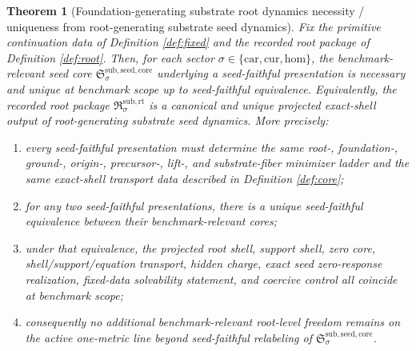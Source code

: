 \documentclass[11pt]{article}
\newcommand{\Car}{\mathrm{car}}
\newcommand{\Cur}{\mathrm{cur}}
\newcommand{\Hom}{\mathrm{hom}}
\newcommand{\RootPackage}{\mathfrak R^{\mathrm{sub,rt}}}
\newcommand{\SeedCore}{\mathfrak S^{\mathrm{sub,seed,core}}}
\newtheorem{theorem}{Theorem}
\begin{document}
\begin{theorem}[Foundation-generating substrate root dynamics necessity / uniqueness from root-generating substrate seed dynamics]
\label{thm:main}
Fix the primitive continuation data of Definition \ref{def:fixed} and the recorded root package of Definition \ref{def:root}. Then, for each sector \(\sigma\in\{\Car,\Cur,\Hom\}\), the benchmark-relevant seed core \(\SeedCore_{\sigma}\) underlying a seed-faithful presentation is necessary and unique at benchmark scope up to seed-faithful equivalence. Equivalently, the recorded root package \(\RootPackage_{\sigma}\) is a canonical and unique projected exact-shell output of root-generating substrate seed dynamics. More precisely:
\begin{enumerate}
    \item every seed-faithful presentation must determine the same root-, foundation-, ground-, origin-, precursor-, lift-, and substrate-fiber minimizer ladder and the same exact-shell transport data described in Definition \ref{def:core};
    \item for any two seed-faithful presentations, there is a unique seed-faithful equivalence between their benchmark-relevant cores;
    \item under that equivalence, the projected root shell, support shell, zero core, shell/support/equation transport, hidden charge, exact seed zero-response realization, fixed-data solvability statement, and coercive control all coincide at benchmark scope;
    \item consequently no additional benchmark-relevant root-level freedom remains on the active one-metric line beyond seed-faithful relabeling of \(\SeedCore_{\sigma}\).
\end{enumerate}
\end{theorem}
\end{document}
